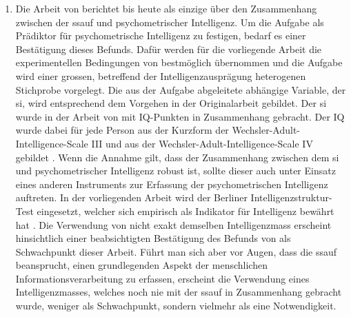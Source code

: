 \documentclass[11pt, twoside, a4paper]{book}		%
\begin{document}
\begin{enumerate}
	\item Die Arbeit von \citet{Melnick2013} berichtet bis heute als einzige über den Zusammenhang zwischen der \gls{ssauf} und psychometrischer Intelligenz. Um die Aufgabe als Prädiktor für psychometrische Intelligenz zu festigen, bedarf es einer Bestätigung dieses Befunds. Dafür werden für die vorliegende Arbeit die experimentellen Bedingungen von \citeauthor{Melnick2013} bestmöglich übernommen und die Aufgabe wird einer grossen, betreffend der Intelligenzausprägung heterogenen Stichprobe vorgelegt. Die aus der Aufgabe abgeleitete abhängige Variable, der \gls{si}, wird entsprechend dem Vorgehen in der Originalarbeit gebildet. Der \gls{si} wurde in der Arbeit von \citeauthor{Melnick2013} mit IQ-Punkten in Zusammenhang gebracht. Der IQ wurde dabei für jede Person aus der Kurzform der Wechsler-Adult-Intelligence-Scale III \citep{Axelrod2002} und aus der Wechsler-Adult-In\-tell\-igence-Scale IV \citep{Wechsler2008} gebildet \citep[siehe Studie 1 und 2 bei][]{Melnick2013}. Wenn die Annahme gilt, dass der Zusammenhang zwischen dem \gls{si} und psychometrischer Intelligenz robust ist, sollte dieser auch unter Einsatz eines anderen Instruments zur Erfassung der psychometrischen Intelligenz auftreten. In der  vorliegenden Arbeit wird der Berliner Intelligenzstruktur-Test \citep{Jaeger1997} eingesetzt, welcher sich empirisch als Indikator für Intelligenz bewährt hat \citep{Beauducel2002, Valerius2014}. Die Verwendung von nicht exakt demselben Intelligenzmass erscheint hinsichtlich einer beabsichtigten Bestätigung des Befunds von \citeauthor{Melnick2013} als Schwachpunkt dieser Arbeit. Führt man sich aber vor Augen, dass die \gls{ssauf} beansprucht, einen grundlegenden Aspekt der menschlichen Informationsverarbeitung zu erfassen, erscheint die Verwendung eines Intelligenzmasses, welches noch nie mit der \gls{ssauf} in Zusammenhang gebracht wurde, weniger als Schwachpunkt, sondern vielmehr als eine Notwendigkeit.


\end{enumerate}
\end{document}
